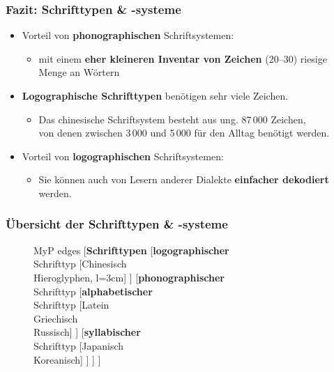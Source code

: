 \begin{frame}
\frametitle{Fazit: Schrifttypen \& -systeme}

\begin{itemize}
	\item Vorteil von \textbf{phonographischen} Schriftsystemen:
	
	\begin{itemize}
		\item mit einem \textbf{eher kleineren Inventar von Zeichen} (20--30) \ras riesige Menge an Wörtern
	\end{itemize}
	
	\item \textbf{Logographische Schrifttypen} benötigen sehr viele Zeichen.
	
	\begin{itemize}
		\item Das chinesische Schriftsystem besteht aus ung. 87\,000 Zeichen,\\
                  von denen zwischen 3\,000 und 5\,000 für den Alltag benötigt werden.
	\end{itemize}
	
\pause 	

	\item Vorteil von \textbf{logographischen} Schriftsystemen:
	\begin{itemize}
		\item Sie können auch von Lesern anderer Dialekte \textbf{einfacher dekodiert} werden.
	\end{itemize}	
\end{itemize}
\end{frame}


\begin{frame}
\frametitle{Übersicht der Schrifttypen \& -systeme}


\begin{figure}
	\centering
	\begin{forest}
		MyP edges
		[\textbf{Schrifttypen}
		[\textbf{logographischer} \\ Schrifttyp
		[Chinesisch \\ Hieroglyphen, l=3cm]
		]
		[\textbf{phonographischer} \\ Schrifttyp
		[\textbf{alphabetischer} \\ Schrifttyp
		[Latein \\ Griechisch \\ Russisch]
		]
		[\textbf{syllabischer} \\ Schrifttyp
		[Japanisch \\ Koreanisch]
		]
		]
		]
	\end{forest}
\end{figure}

\end{frame}


